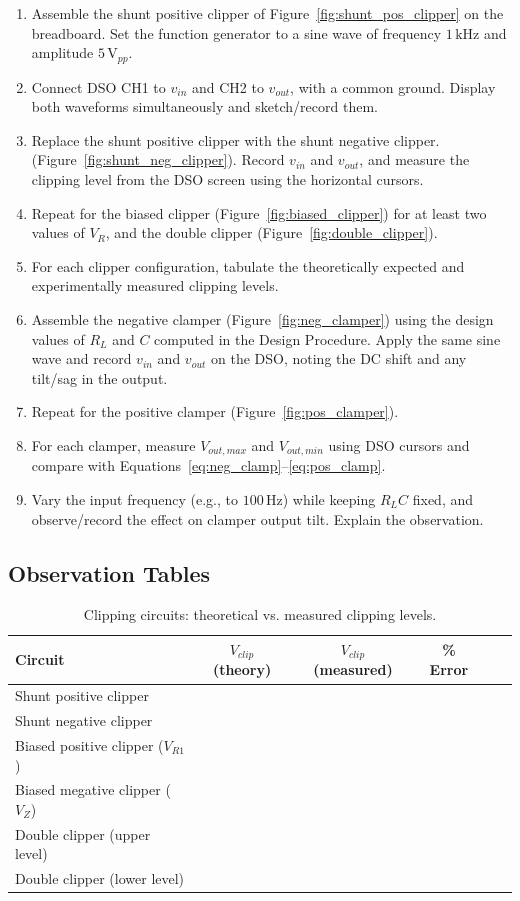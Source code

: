\begin{enumerate}[label=\arabic*.]
	\item Assemble the shunt positive clipper of Figure~\ref{fig:shunt_pos_clipper} on the breadboard. Set the function generator to a sine wave of frequency $1\,\text{kHz}$ and amplitude $5\,\text{V}_{pp}$.
	\item Connect DSO CH1 to $v_{in}$ and CH2 to $v_{out}$, with a common ground. Display both waveforms simultaneously and sketch/record them.
	\item Replace the shunt positive clipper with the shunt negative clipper. (Figure~\ref{fig:shunt_neg_clipper}). Record $v_{in}$ and $v_{out}$, and measure the clipping level from the DSO screen using the horizontal cursors.
	\item Repeat for the biased clipper (Figure~\ref{fig:biased_clipper}) for at least two values of $V_R$, and the double clipper (Figure~\ref{fig:double_clipper}).
	\item For each clipper configuration, tabulate the theoretically expected and experimentally measured clipping levels.
	\item Assemble the negative clamper (Figure~\ref{fig:neg_clamper}) using the design values of $R_L$ and $C$ computed in the Design Procedure. Apply the same sine wave and record $v_{in}$ and $v_{out}$ on the DSO, noting the DC shift and any tilt/sag in the output.
	\item Repeat for the positive clamper (Figure~\ref{fig:pos_clamper}).
	\item For each clamper, measure $V_{out,max}$ and $V_{out,min}$ using DSO cursors and compare with Equations~\eqref{eq:neg_clamp}--\eqref{eq:pos_clamp}.
	\item Vary the input frequency (e.g., to $100\,\text{Hz}$) while keeping $R_L C$ fixed, and observe/record the effect on clamper output tilt. Explain the observation.
\end{enumerate}

\subsection{Observation Tables}

\begin{table}[hb!]
	\centering
	\begin{tabular}{@{}lccccc@{}}
		\toprule
		Circuit & $V_{clip}$ (theory) & $V_{clip}$ (measured) & \% Error \\
		\midrule
		Shunt positive clipper &  &  &  \\
		Shunt negative clipper &  &  &  \\
		Biased positive clipper ($V_{R1}$) &  &  &  \\
		Biased megative clipper ($V_{Z}$) &  &  &  \\
		Double clipper (upper level) &  &  &  \\
		Double clipper (lower level) &  &  &  \\
		\bottomrule
	\end{tabular}
	\caption{Clipping circuits: theoretical vs. measured clipping levels.}
\end{table}

